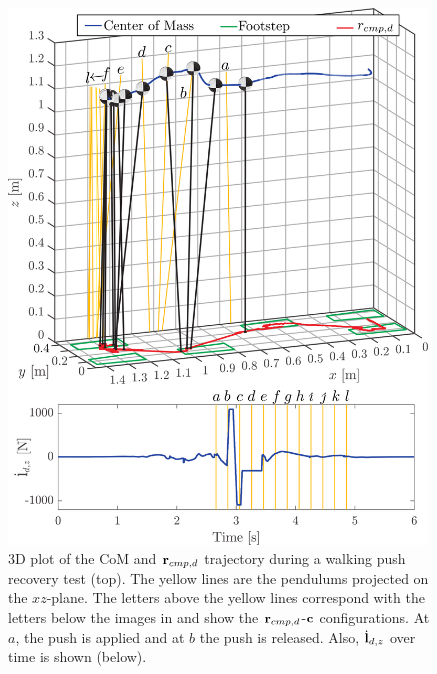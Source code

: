\begin{figure}
     \centering
        \includegraphics[width=0.99\textwidth]{STYLESTUFF/walk3D2.png}
        \caption{\ac{3D} plot of the \ac{CoM} and $\mathbf{r}_{cmp,d}$ trajectory during a walking push recovery test (top). The yellow lines are the pendulums projected on the $xz$-plane. The letters above the yellow lines correspond with the letters below the images in  and show the $\mathbf{r}_{cmp,d}$-$\mathbf{c}$ configurations. At $a$, the push is applied and at $b$ the push is released. Also, $\dot{\mathbf{l}}_{d,z}$ over time is shown (below).}
        \label{fig:walk3D}
\end{figure}

